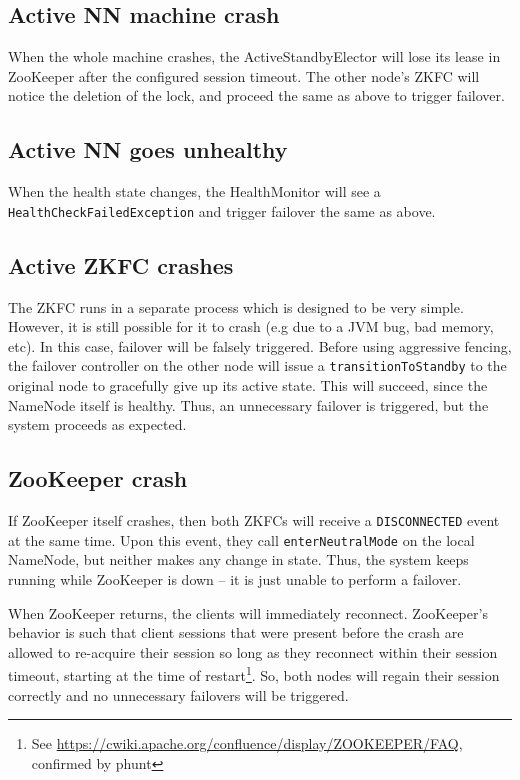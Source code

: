 \documentclass{article}
\begin{document}
\subsection{Active NN machine crash}

When the whole machine crashes, the ActiveStandbyElector will lose its lease in ZooKeeper after the configured session timeout. The other node's ZKFC will notice the deletion of the lock, and proceed the same as above to trigger failover.

\subsection{Active NN goes unhealthy}

When the health state changes, the HealthMonitor will see a {\tt HealthCheckFailedException} and trigger failover the same as above.

\subsection{Active ZKFC crashes}

The ZKFC runs in a separate process which is designed to be very simple. However, it is still possible for it to crash (e.g due to a JVM bug, bad memory, etc). In this case, failover will be falsely triggered. Before using aggressive fencing, the failover controller on the other node will issue a {\tt transitionToStandby} to the original node to gracefully give up its active state. This will succeed, since the NameNode itself is healthy. Thus, an unnecessary failover is triggered, but the system proceeds as expected.

\subsection{ZooKeeper crash}

If ZooKeeper itself crashes, then both ZKFCs will receive a {\tt DISCONNECTED} event at the same time. Upon this event, they call {\tt enterNeutralMode} on the local NameNode, but neither makes any change in state. Thus, the system keeps running while ZooKeeper is down -- it is just unable to perform a failover.

When ZooKeeper returns, the clients will immediately reconnect. ZooKeeper's behavior is such that client sessions that were present before the crash are allowed to re-acquire their session so long as they reconnect within their session timeout, starting at the time of restart\footnote{See \url{https://cwiki.apache.org/confluence/display/ZOOKEEPER/FAQ}, confirmed by phunt}. So, both nodes will regain their session correctly and no unnecessary failovers will be triggered.
\end{document}
